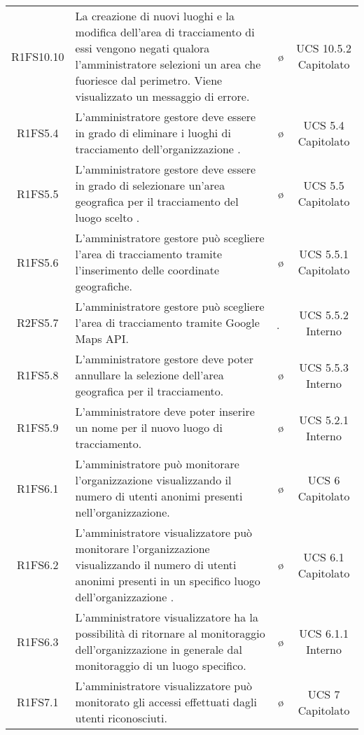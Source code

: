 {\begin{longtable}{ c C{6.5cm} c c}
R1FS10.10 & La creazione di nuovi luoghi e la modifica dell'area di tracciamento di essi vengono negati qualora l'amministratore selezioni un area che fuoriesce dal perimetro. Viene visualizzato un messaggio di errore. & \o & UCS 10.5.2 Capitolato \\

R1FS5.4 & L'amministratore gestore deve essere in grado di eliminare i luoghi di tracciamento dell'organizzazione . & \o & UCS 5.4 Capitolato\\

R1FS5.5 & L'amministratore gestore deve essere in grado di selezionare un'area geografica per il tracciamento del luogo scelto . & \o & UCS 5.5 Capitolato\\

R1FS5.6 &  L'amministratore gestore può scegliere l'area di tracciamento tramite l'inserimento delle coordinate geografiche. & \o & UCS 5.5.1 Capitolato\\

R2FS5.7 & L'amministratore gestore può scegliere l'area di tracciamento tramite Google Maps API. & \d & UCS 5.5.2 Interno\\

R1FS5.8 & L'amministratore gestore deve poter annullare la selezione dell'area geografica per il tracciamento. & \o & UCS 5.5.3 Interno\\

R1FS5.9 & L'amministratore deve poter inserire un nome per il nuovo luogo di tracciamento. & \o & UCS 5.2.1 Interno\\

R1FS6.1 & L'amministratore può monitorare l'organizzazione visualizzando il numero di utenti anonimi presenti nell'organizzazione. & \o & UCS 6 Capitolato\\

R1FS6.2 & L'amministratore visualizzatore può monitorare l'organizzazione visualizzando il numero di utenti anonimi presenti in un specifico luogo dell'organizzazione . & \o & UCS 6.1 Capitolato\\

R1FS6.3 & L'amministratore visualizzatore ha la possibilità di ritornare al monitoraggio dell'organizzazione in generale dal monitoraggio di un luogo specifico. & \o & UCS 6.1.1 Interno\\

R1FS7.1 & L'amministratore visualizzatore può monitorato gli accessi effettuati dagli utenti riconosciuti. & \o & UCS 7 Capitolato\\


\end{longtable}}
